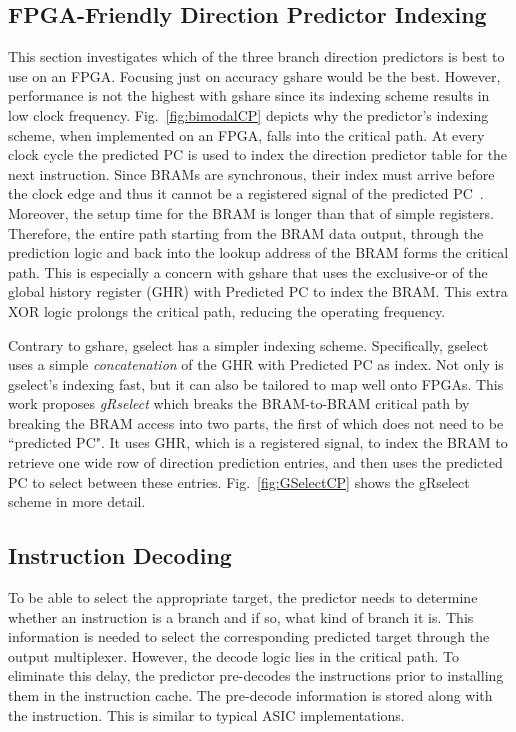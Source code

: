 \subsection{FPGA-Friendly Direction Predictor Indexing}
\label{sec:min:fpga:indexing}
This section investigates which of the three branch direction predictors is best to use on an FPGA. Focusing just on accuracy gshare would be the best. However, performance is not the highest with gshare since its indexing scheme results in low clock frequency. Fig.~\ref{fig:bimodalCP} depicts why the predictor's indexing scheme, when implemented on an FPGA, falls into the critical path. At every clock cycle the predicted PC is used to index the direction predictor table for the next instruction. Since BRAMs are synchronous, their index must arrive before the clock edge and thus it cannot be a registered signal of the predicted PC~\cite{StratixIVM9K}. Moreover, the setup time for the BRAM is longer than that of simple registers. Therefore, the entire path starting from the BRAM data output, through the prediction logic and back into the lookup address of the BRAM forms the critical path. This is especially a concern with gshare that uses the exclusive-or of the global history register (GHR) with Predicted PC to index the BRAM. This extra XOR logic prolongs the critical path, reducing the operating frequency.

Contrary to gshare, gselect has a simpler indexing scheme. Specifically, gselect uses a simple \textit{concatenation} of the GHR with Predicted PC as index. Not only is gselect's indexing fast, but it can also  be tailored to map well onto FPGAs. This work proposes \textit{gRselect} which breaks the BRAM-to-BRAM critical path by breaking the BRAM access into two parts, the first of which does not need to be ``predicted PC". It uses GHR, which is a registered signal, to index the BRAM to retrieve one wide row of direction prediction entries, and then uses the predicted PC to select between these entries. Fig.~\ref{fig:GSelectCP} shows the gRselect scheme in more detail.


\subsection{Instruction Decoding}
\label{sec:min:fpga:predecode}
To be able to select the appropriate target, the predictor needs to determine whether an instruction is a branch and if so, what kind of branch it is. This information is needed to select the corresponding predicted target through the output multiplexer. However, the decode logic lies in the critical path. To eliminate this delay, the predictor pre-decodes the instructions prior to installing them in the instruction cache. The pre-decode information is stored along with the instruction. This is similar to  typical ASIC implementations.

 



